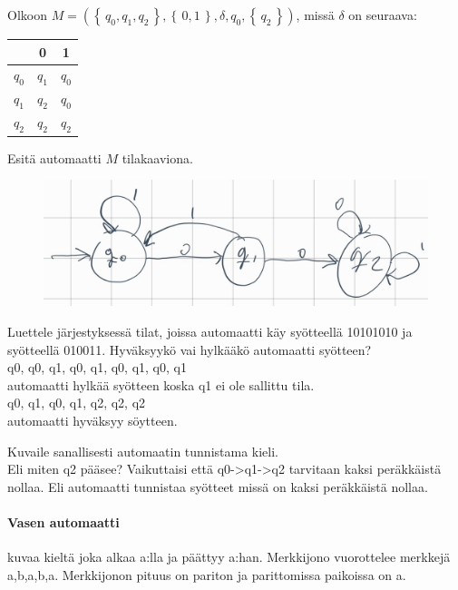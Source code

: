 \documentclass[12pt,a4paper]{article}
\newcommand{\set}[1]{\left\{\,#1\,\right\}}
\begin{document}
Olkoon $M=(\set{q_0,q_1,q_2},\set{0,1},\delta,q_0,\set{q_2})$,
missä $\delta$ on seuraava:
\begin{center}
\begin{tabular}{c|cc}
& 0 & 1\\\hline
$q_0$ & $q_1$ & $q_0$\\
$q_1$ & $q_2$ & $q_0$\\
$q_2$ & $q_2$ & $q_2$
\end{tabular}
\end{center}
\begin{kohta}
\item Esitä automaatti $M$ tilakaaviona.
\begin{figure}[h]
  \centering
  \includegraphics[width=.8\textwidth]{viikko2tehtävä4.jpg}
\end{figure}
\item Luettele järjestyksessä tilat, joissa automaatti käy syötteellä 10101010 ja syötteellä 010011. Hyväksyykö vai hylkääkö automaatti syötteen?\\

q0, q0, q1, q0, q1, q0, q1, q0, q1\\

automaatti hylkää syötteen koska q1 ei ole sallittu tila.\\

q0, q1, q0, q1, q2, q2, q2\\

automaatti hyväksyy söytteen.

\item Kuvaile sanallisesti automaatin tunnistama kieli.\\

Eli miten q2 pääsee? Vaikuttaisi että q0->q1->q2 tarvitaan
kaksi peräkkäistä nollaa. Eli automaatti tunnistaa syötteet missä on
kaksi peräkkäistä nollaa.
\end{kohta}



\pagebreak
{}

\paragraph{Vasen automaatti} kuvaa kieltä joka alkaa a:lla
ja päättyy a:han. Merkkijono vuorottelee merkkejä a,b,a,b,a.
Merkkijonon pituus on pariton ja parittomissa paikoissa on a.
\end{document}

